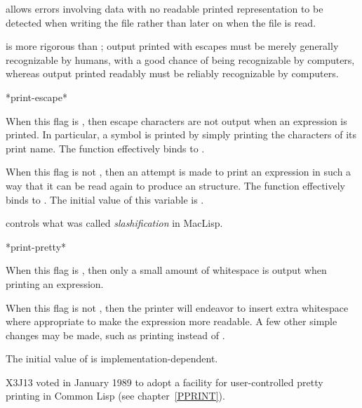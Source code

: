 \begin{newer}
\begin{defun}[Variable]
   allows errors involving data with no
  readable printed representation to be detected when writing the file rather than
  later on when the file is read.

   is more rigorous than ; output printed
  with escapes must be merely generally recognizable by humans, with a good chance
  of being recognizable by computers, whereas
  output printed readably must be reliably recognizable by computers.
\end{defun}
\end{newer}

\begin{defun}[Variable]
*print-escape*

When this flag is {\false}, then escape characters are not output
when an expression is printed.  In particular, a symbol is printed
by simply printing the characters of its print name.
The function  effectively binds  to {\false}.

When this flag is not {\false}, then an attempt is made to print an
expression in such a way that it can be read again to produce an
 structure.
The function  effectively binds  to {\true}.
The initial value of this variable is {\true}.

\beforenoterule
\begin{incompatibility}
 controls what was called {\it slashification}
in MacLisp.
\end{incompatibility}
\afternoterule
\end{defun}

\begin{defun}[Variable]
*print-pretty*

When this flag is {\false}, then only a small amount of whitespace is
output when printing an expression.

When this flag is not {\false}, then the printer will endeavor to insert
extra whitespace where appropriate to make the expression more readable.
A few other simple changes may be made, such as printing 
instead of .

The initial value of  is implementation-dependent.

\begin{new}
X3J13 voted in January 1989
to adopt a facility for user-controlled pretty printing
in Common Lisp
(see chapter~\ref{PPRINT}).
\end{new}
\end{defun}

